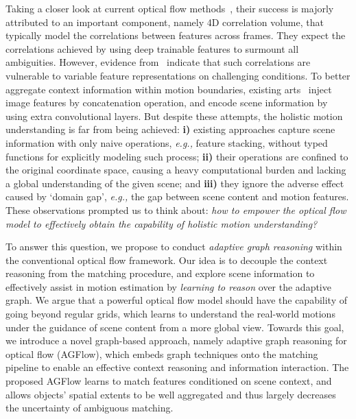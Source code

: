 \documentclass[letterpaper]{article} %
\begin{document}
Taking a closer look at current optical flow methods~\cite{Sun2018PWCNetCF, Yang2019VolumetricCN}, their success is majorly attributed to an important component, namely 4D correlation volume, that typically model the correlations between features across frames. They expect the correlations achieved by using deep trainable features to surmount all ambiguities. However, evidence from~\cite{Teed2020RAFTRA} indicate that such correlations are vulnerable to variable feature representations on challenging conditions. To better aggregate context information within motion boundaries, existing arts~\cite{Teed2020RAFTRA,Jiang2021LearningOF} inject image features by concatenation operation, and encode scene information by using extra convolutional layers. But despite these attempts, the holistic motion understanding is far from being achieved: {\bfseries i)} existing approaches capture scene information with only naive operations, \emph{e.g.,} feature stacking, without typed functions for explicitly modeling such process; {\bfseries ii)} their operations are confined to the original coordinate space, causing a heavy computational burden and lacking a global understanding of the given scene; and {\bfseries iii)} they ignore the adverse effect caused by `domain gap', \emph{e.g.,} the gap between scene content and motion features. These observations prompted us to think about: \emph{how to empower the optical flow model to effectively obtain the capability of holistic motion understanding?} 

To answer this question, we propose to conduct \emph{adaptive graph reasoning} within the conventional optical flow framework. Our idea is to decouple the context reasoning from the matching procedure, and explore scene information to effectively assist in motion estimation by \emph{learning to reason} over the adaptive graph. We argue that a powerful optical flow model should have the capability of going beyond regular grids, which learns to understand the real-world motions under the guidance of scene content from a more global view. Towards this goal, we introduce a novel graph-based approach, namely adaptive graph reasoning for optical flow (AGFlow), which embeds graph techniques onto the matching pipeline to enable an effective context reasoning and information interaction. The proposed AGFlow learns to match features conditioned on scene context, and allows objects' spatial extents to be well aggregated and thus largely decreases the uncertainty of ambiguous matching.
\end{document}
